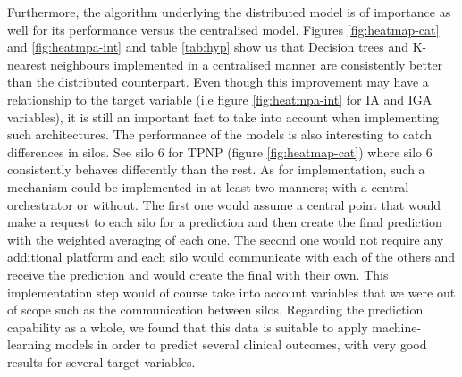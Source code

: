 Furthermore, the algorithm underlying the distributed model is of importance as well for its performance versus the centralised model. Figures \ref{fig:heatmap-cat} and \ref{fig:heatmpa-int} and table \ref{tab:hyp} show us that Decision trees and K-nearest neighbours implemented in a centralised manner are consistently better than the distributed counterpart. Even though this improvement may have a relationship to the target variable (i.e figure \ref{fig:heatmpa-int} for IA and IGA variables), it is still an important fact to take into account when implementing such architectures. The performance of the models is also interesting to catch differences in silos. See silo 6 for TPNP (figure \ref{fig:heatmap-cat}) where silo 6 consistently behaves differently than the rest.
As for implementation, such a mechanism could be implemented in at least two manners; with a central orchestrator or without. The first one would assume a central point that would make a request to each silo for a prediction and then create the final prediction with the weighted averaging of each one. The second one would not require any additional platform and each silo would communicate with each of the others and receive the prediction and would create the final with their own. This implementation step would of course take into account variables that we were out of scope such as the communication between silos. 
Regarding the prediction capability as a whole, we found that this data is suitable to apply machine-learning models in order to predict several clinical outcomes, with very good results for several target variables. 

